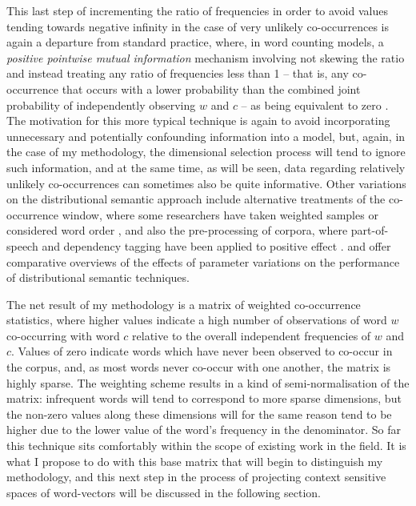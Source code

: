 This last step of incrementing the ratio of frequencies in order to avoid values tending towards negative infinity in the case of very unlikely co-occurrences is again a departure from standard practice, where, in word counting models, a \emph{positive pointwise mutual information} mechanism involving not skewing the ratio and instead treating any ratio of frequencies less than 1 -- that is, any co-occurrence that occurs with a lower probability than the combined joint probability of independently observing $w$ and $c$ -- as being equivalent to zero \citep[][have considered a more general variable ratio shifting parameter]{LevyEA2014b}.  The motivation for this more typical technique is again to avoid incorporating unnecessary and potentially confounding information into a model, but, again, in the case of my methodology, the dimensional selection process will tend to ignore such information, and at the same time, as will be seen, data regarding relatively unlikely co-occurrences can sometimes also be quite informative.  Other variations on the distributional semantic approach include alternative treatments of the co-occurrence window, where some researchers have taken weighted samples or considered word order \citep{SocherEA2013b}, and also the pre-processing of corpora, where part-of-speech and dependency tagging have been applied to positive effect \citep{PadoEA2007}.  \cite{LapesaEA2014} and \cite{MilajevsEA2016} offer comparative overviews of the effects of parameter variations on the performance of distributional semantic techniques.

The net result of my methodology is a matrix of weighted co-occurrence statistics, where higher values indicate a high number of observations of word $w$ co-occurring with word $c$ relative to the overall independent frequencies of $w$ and $c$.  Values of zero indicate words which have never been observed to co-occur in the corpus, and, as most words never co-occur with one another, the matrix is highly sparse.  The weighting scheme results in a kind of semi-normalisation of the matrix: infrequent words will tend to correspond to more sparse dimensions, but the non-zero values along these dimensions will for the same reason tend to be higher due to the lower value of the word's frequency in the denominator.  So far this technique sits comfortably within the scope of existing work in the field.  It is what I propose to do with this base matrix that will begin to distinguish my methodology, and this next step in the process of projecting context sensitive spaces of word-vectors will be discussed in the following section.

